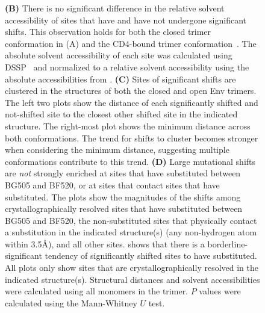 \documentclass[9pt]{elife}
\newcommand{\angstrom}{\textup{\AA}}
\begin{document}
\begin{figure}
{{\bf (B)} 
There is no significant difference in the relative solvent accessibility of sites that have and have not undergone significant shifts.
This observation holds for both the closed trimer conformation in (A) and the CD4-bound trimer conformation~\citep[PDB 5VN3;][]{ozorowski2017open}.
The absolute solvent accessibility of each site was calculated using DSSP~\citep{kabsch1983dictionary} and normalized to a relative solvent accessibility using the absolute accessibilities from \citet{tien2013maximum}.
{\bf (C)} 
Sites of significant shifts are clustered in the structures of both the closed and open Env trimers.
The left two plots show the distance of each significantly shifted and not-shifted site to the closest other shifted site in the indicated structure.
The right-most plot shows the minimum distance across both conformations.
The trend for shifts to cluster becomes stronger when considering the minimum distance, suggesting multiple conformations contribute to this trend.
{\bf (D)}
Large mutational shifts are \emph{not} strongly enriched at sites that have substituted between BG505 and BF520, or at sites that contact sites that have substituted. 
The plots show the magnitudes of the shifts among crystallographically resolved sites that have substituted between BG505 and BF520, the non-substituted sites that physically contact a substitution in the indicated structure(s) (any non-hydrogen atom within 3.5\angstrom), and all other sites.
 shows that there is a borderline-significant tendency of significantly shifted sites to have substituted.
All plots only show sites that are crystallographically resolved in the indicated structure(s). 
Structural distances and solvent accessibilities were calculated using all monomers in the trimer.
$P$ values were calculated using the Mann-Whitney $U$ test.
}
{}


\end{figure}
\end{document}
